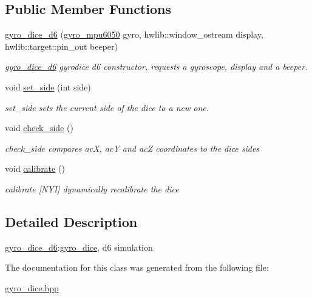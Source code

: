 \subsection*{Public Member Functions}
\begin{DoxyCompactItemize}
\item 
\mbox{\label{classgyro__dice__d6_ab8c27fd869269f4fdc6fcebc8cadad69}} 
\hyperlink{classgyro__dice__d6_ab8c27fd869269f4fdc6fcebc8cadad69}{gyro\+\_\+dice\+\_\+d6} (\hyperlink{classgyro__mpu6050}{gyro\+\_\+mpu6050} gyro, hwlib\+::window\+\_\+ostream display, hwlib\+::target\+::pin\+\_\+out beeper)
\begin{DoxyCompactList}\small\item\em \hyperlink{classgyro__dice__d6}{gyro\+\_\+dice\+\_\+d6} gyrodice d6 constructor, requests a gyroscope, display and a beeper. \end{DoxyCompactList}\item 
\mbox{\label{classgyro__dice__d6_adfed161fb9dec492492bfd54d44e7f20}} 
void \hyperlink{classgyro__dice__d6_adfed161fb9dec492492bfd54d44e7f20}{set\+\_\+side} (int side)
\begin{DoxyCompactList}\small\item\em set\+\_\+side sets the current side of the dice to a new one. \end{DoxyCompactList}\item 
\mbox{\label{classgyro__dice__d6_a5efaa5701303b46ec1b9a7bcd451ba25}} 
void \hyperlink{classgyro__dice__d6_a5efaa5701303b46ec1b9a7bcd451ba25}{check\+\_\+side} ()
\begin{DoxyCompactList}\small\item\em check\+\_\+side compares acX, acY and acZ coordinates to the dice sides \end{DoxyCompactList}\item 
\mbox{\label{classgyro__dice__d6_a59180a3bc78e6ab0b69867a0d104e789}} 
void \hyperlink{classgyro__dice__d6_a59180a3bc78e6ab0b69867a0d104e789}{calibrate} ()
\begin{DoxyCompactList}\small\item\em calibrate \mbox{[}N\+YI\mbox{]} dynamically recalibrate the dice \end{DoxyCompactList}\end{DoxyCompactItemize}


\subsection{Detailed Description}
\hyperlink{classgyro__dice__d6}{gyro\+\_\+dice\+\_\+d6}\+:\hyperlink{classgyro__dice}{gyro\+\_\+dice}, d6 simulation 

The documentation for this class was generated from the following file\+:\begin{DoxyCompactItemize}
\item 
\hyperlink{gyro__dice_8hpp}{gyro\+\_\+dice.\+hpp}\end{DoxyCompactItemize}
